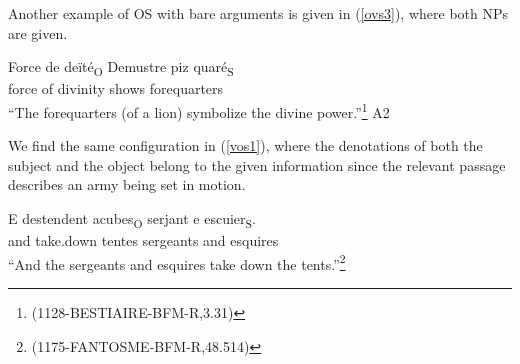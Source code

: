 \documentclass[output=paper,modfonts,nonflat]{langsci/langscibook}
\begin{document}
Another example of OS with bare arguments is given in (\ref{ovs3}), where both NPs are given.

\ea
\gll Force de de\"{i}t\'{e}\textsubscript{O} Demustre {piz quar\'{e}}\textsubscript{S}\\
force of divinity shows forequarters \\
\glt ``The forequarters (of a lion) symbolize the divine power.''\footnote{{(1128-BESTIAIRE-BFM-R,3.31)}}\label{ovs3} \hfill A2
\z

We find the same configuration in (\ref{vos1}), where the denotations of both the subject and the object belong to the given information since the relevant passage describes an army being set in motion.

\ea
\gll E destendent acubes\textsubscript{O} serjant e escuier\textsubscript{S}.\\
and take.down tentes sergeants and esquires\\
\glt ``And the sergeants and esquires take down the tents.''\footnote{{(1175-FANTOSME-BFM-R,48.514)}} \hfill \label{vos1}
\z



\end{document}
